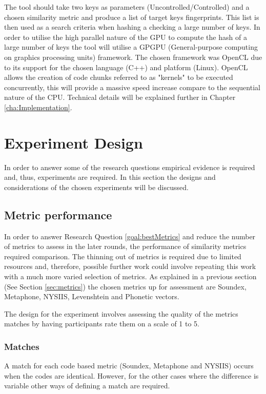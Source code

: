 The tool should take two keys as parameters (Uncontrolled/Controlled) and a chosen similarity metric and produce a list of target keys fingerprints. This list is then used as a search criteria when hashing a checking a large number of keys. In order to utilise the high parallel nature of the GPU to compute the hash of a large number of keys the tool will utilise a GPGPU (General-purpose computing on graphics processing units) framework. The chosen framework was OpenCL due to its support for the chosen language (C++) and platform (Linux). OpenCL allows the creation of code chunks referred to as "kernels" to be executed concurrently, this will provide a massive speed increase compare to the sequential nature of the CPU. Technical details will be explained further in Chapter \ref{cha:Implementation}.

\section{Experiment Design}
In order to answer some of the research questions empirical evidence is required and, thus, experiments are required. In this section the designs and considerations of the chosen experiments will be discussed.

\subsection{Metric performance}
\label{exp:metric}
In order to answer Research Question \ref{goal:bestMetrics} and reduce the number of metrics to assess in the later rounds, the performance of similarity metrics required comparison. The thinning out of metrics is required due to limited resources and, therefore, possible further work could involve repeating this work with a much more varied selection of metrics. As explained in a previous section (See Section \ref{sec:metrics}) the chosen metrics up for assessment are Soundex, Metaphone, NYSIIS, Levenshtein and Phonetic vectors.

The design for the experiment involves assessing the quality of the metrics matches by having participants rate them on a scale of 1 to 5.

\subsubsection{Matches}
A match for each code based metric (Soundex, Metaphone and NYSIIS) occurs when the codes are identical. However, for the other cases where the difference is variable other ways of defining a match are required.

